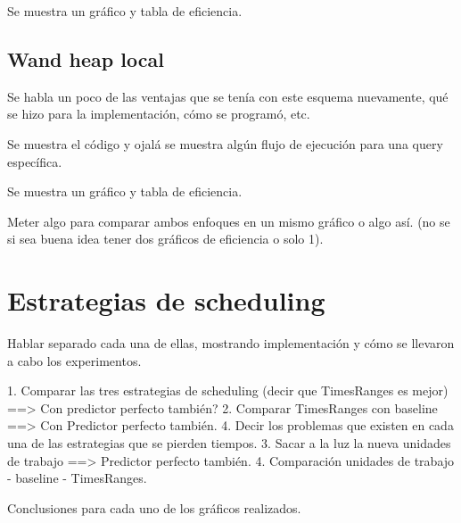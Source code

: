 Se muestra un gráfico y tabla de eficiencia.

\subsection{Wand heap local}
\label{evaluacionexperimental:whl}

Se habla un poco de las ventajas que se tenía con este esquema nuevamente, qué se hizo para la implementación, cómo se programó, etc. 

Se muestra el código y ojalá se muestra algún flujo de ejecución para una query específica.

Se muestra un gráfico y tabla de eficiencia.

Meter algo para comparar ambos enfoques en un mismo gráfico o algo así. (no se si sea buena idea tener dos gráficos de eficiencia o solo 1).


\section{Estrategias de scheduling}
\label{evaluacionexperimental:estrategiasscheduling}

Hablar separado cada una de ellas, mostrando implementación y cómo se llevaron a cabo los experimentos.

1. Comparar las tres estrategias de scheduling (decir que TimesRanges es mejor) ==> Con predictor perfecto también?
2. Comparar TimesRanges con baseline ==> Con Predictor perfecto también.  
4. Decir los problemas que existen en cada una de las estrategias que se pierden tiempos.
3. Sacar a la luz la nueva unidades de trabajo ==> Predictor perfecto también.
4. Comparación unidades de trabajo - baseline - TimesRanges.

Conclusiones para cada uno de los gráficos realizados. 


